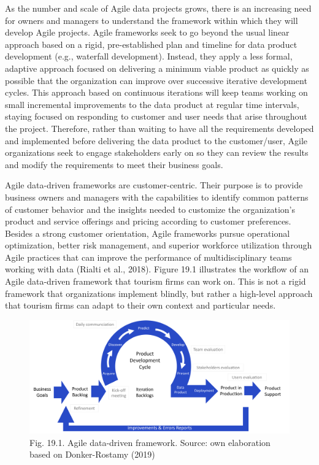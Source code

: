 \documentclass[
  letterpaper,
  DIV=11,
  numbers=noendperiod]{scrreprt}
\begin{document}
As the number and scale of Agile data projects grows, there is an
increasing need for owners and managers to understand the framework
within which they will develop Agile projects. Agile frameworks seek to
go beyond the usual linear approach based on a rigid, pre-established
plan and timeline for data product development (e.g., waterfall
development). Instead, they apply a less formal, adaptive approach
focused on delivering a minimum viable product as quickly as possible
that the organization can improve over successive iterative development
cycles. This approach based on continuous iterations will keep teams
working on small incremental improvements to the data product at regular
time intervals, staying focused on responding to customer and user needs
that arise throughout the project. Therefore, rather than waiting to
have all the requirements developed and implemented before delivering
the data product to the customer/user, Agile organizations seek to
engage stakeholders early on so they can review the results and modify
the requirements to meet their business goals.

Agile data-driven frameworks are customer-centric. Their purpose is to
provide business owners and managers with the capabilities to identify
common patterns of customer behavior and the insights needed to
customize the organization's product and service offerings and pricing
according to customer preferences. Besides a strong customer
orientation, Agile frameworks pursue operational optimization, better
risk management, and superior workforce utilization through Agile
practices that can improve the performance of multidisciplinary teams
working with data (Rialti et al., 2018). Figure 19.1 illustrates the
workflow of an Agile data-driven framework that tourism firms can work
on. This is not a rigid framework that organizations implement blindly,
but rather a high-level approach that tourism firms can adapt to their
own context and particular needs.

\begin{figure}

{\centering \includegraphics{img/fig31.png}

}

\caption{Fig. 19.1. Agile data-driven framework. Source: own elaboration
based on Donker-Rostamy (2019)}

\end{figure}
\end{document}
